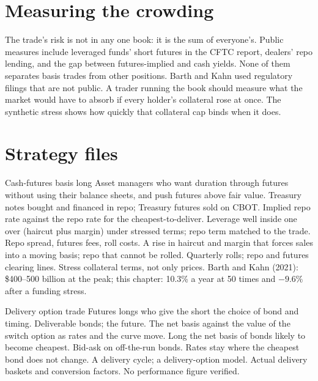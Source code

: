 \section{Measuring the crowding}

The trade's risk is not in any one book: it is the sum of everyone's. Public measures include leveraged funds' short futures in the CFTC report, dealers'
repo lending, and the gap between futures-implied and cash yields. None of them separates basis trades from other positions. Barth and Kahn used
regulatory filings that are not public. A trader running the book should measure what the market would have to absorb if every holder's collateral
rose at once. The synthetic stress shows how quickly that collateral cap binds when it does.

\section{Strategy files}

\begin{strategyfile}{Cash-futures basis long}\label{strat:s2:the-bond-futures-basis-trade:long}
 Asset managers who want duration through futures without using their balance sheets, and push futures above
fair value.
 Treasury notes bought and financed in repo; Treasury futures sold on CBOT.
 Implied repo rate against the repo rate for the cheapest-to-deliver.
 Leverage well inside one over (haircut plus margin) under stressed terms; repo term matched to the trade.
 Repo spread, futures fees, roll costs.
 A rise in haircut and margin that forces sales into a moving basis; repo that cannot be rolled.
 Quarterly rolls; repo and futures clearing lines.
 Stress collateral terms, not only prices.
 Barth and Kahn (2021): \$400--500 billion at the peak; this chapter: 10.3\% a year at 50 times and $-9.6\%$ after a funding stress.
\end{strategyfile}

\begin{strategyfile}{Delivery option trade}\label{strat:s2:the-bond-futures-basis-trade:delivery}
 Futures longs who give the short the choice of bond and timing.
 Deliverable bonds; the future.
 The net basis against the value of the switch option as rates and the curve move.
 Long the net basis of bonds likely to become cheapest.
 Bid-ask on off-the-run bonds.
 Rates stay where the cheapest bond does not change.
 A delivery cycle; a delivery-option model.
 Actual delivery baskets and conversion factors.
 No performance figure verified.
\end{strategyfile}

